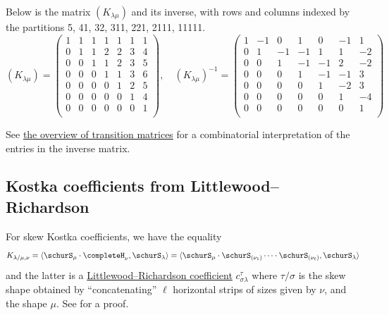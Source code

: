 \begin{example*}
Below is the matrix $(K_{\lambda\mu})$ and its inverse, with rows and columns indexed by
the partitions 5, 41, 32, 311, 221, 2111, 11111.
\[
(K_{\lambda\mu})=
\begin{pmatrix}
 1 & 1 & 1 & 1 & 1 & 1 & 1 \\
 0 & 1 & 1 & 2 & 2 & 3 & 4 \\
 0 & 0 & 1 & 1 & 2 & 3 & 5 \\
 0 & 0 & 0 & 1 & 1 & 3 & 6 \\
 0 & 0 & 0 & 0 & 1 & 2 & 5 \\
 0 & 0 & 0 & 0 & 0 & 1 & 4 \\
 0 & 0 & 0 & 0 & 0 & 0 & 1 \\
\end{pmatrix}
,
\quad 
(K_{\lambda\mu})^{-1}=
\begin{pmatrix}
 1 & -1 & 0 & 1 & 0 & -1 & 1 \\
 0 & 1 & -1 & -1 & 1 & 1 & -2 \\
 0 & 0 & 1 & -1 & -1 & 2 & -2 \\
 0 & 0 & 0 & 1 & -1 & -1 & 3 \\
 0 & 0 & 0 & 0 & 1 & -2 & 3 \\
 0 & 0 & 0 & 0 & 0 & 1 & -4 \\
 0 & 0 & 0 & 0 & 0 & 0 & 1 \\
\end{pmatrix}
\]
\end{example*}

See \hyperref[symmetricTransitionMatrices]{the overview of transition matrices}
for a combinatorial interpretation of the entries in the inverse matrix.



\subsection[kostkaFromLR]{Kostka coefficients from Littlewood--Richardson}
\begin{proposition}
For skew Kostka coefficients, we have the equality
\[
K_{\lambda/\mu,\nu} = \langle \schurS_{\mu} \cdot \completeH_{\nu} ,  \schurS_\lambda \rangle =
\langle \schurS_{\mu} \cdot \schurS_{(\nu_1)} \dotsm \cdot \schurS_{(\nu_\ell)} ,  \schurS_\lambda \rangle
\]
and the latter is a \hyperref[littlewoodRichardsonModels]{Littlewood--Richardson coefficient} $c^{\tau}_{\sigma\lambda}$
where $\tau/\sigma$ is the skew shape obtained by \enquote{concatenating}
$\ell$ horizontal strips of sizes given by $\nu$, and the shape $\mu$.
See \cite[p.~338]{StanleyEC2} for a proof.
\end{proposition}


